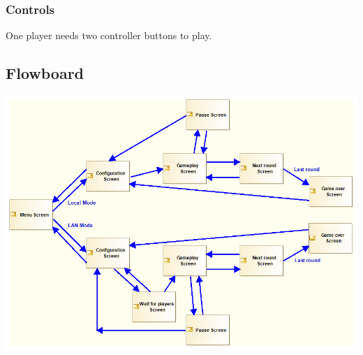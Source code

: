 \subsubsection{Controls}
\noindent One player needs two controller buttons to play.

\newpage
\subsection{Flowboard}
\begin{center}
	\includegraphics[width=\textwidth]{flowboard}
\end{center}